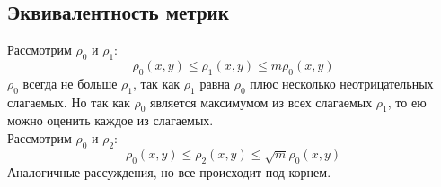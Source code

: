 \subsection{Эквивалентность метрик}
Рассмотрим $\rho_0$ и $\rho_1$:
$$
\rho_0(x,y) \leq \rho_1(x,y) \leq m\rho_0(x,y)
$$
$\rho_0$ всегда не больше $\rho_1$, так как $\rho_1$ равна $\rho_0$ плюс несколько неотрицательных слагаемых. Но так как $\rho_0$ является максимумом из всех слагаемых $\rho_1$, то ею можно оценить каждое из слагаемых. \\
Рассмотрим $\rho_0$ и $\rho_2$:
$$
\rho_0(x,y) \leq \rho_2(x,y) \leq \sqrt{m} \rho_0(x,y)
$$
Аналогичные рассуждения, но все происходит под корнем.
